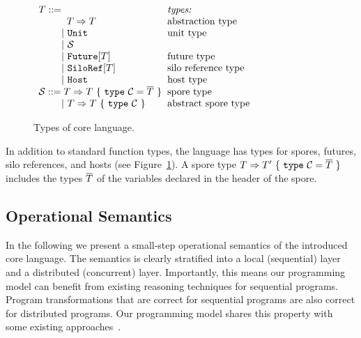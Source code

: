 \begin{figure}[h!]
\centering
$\ba[t]{l@{\hspace{2mm}}l}
T ::=                                                                  & \mbox{{\it{types:}}} \\
\gap \:\:\:\: T \Rightarrow T                                          & \mbox{abstraction type} \\
\gap ~|~  \texttt{Unit}                                                & \mbox{unit type} \\
\gap ~|~  \mathcal{S}                                                  & \mbox{} \\
\gap ~|~  \texttt{Future}[T]                                           & \mbox{future type} \\
\gap ~|~  \texttt{SiloRef}[T]                                          & \mbox{silo reference type} \\
\gap ~|~  \texttt{Host}                                                & \mbox{host type} \\
\mathcal{S} ::= T \Rightarrow T~\{~\texttt{type}~\mathcal{C} = \seq{T}~\}   & \mbox{spore type} \\
\gap ~|~ T \Rightarrow T~\{~\texttt{type}~\mathcal{C}~\}               & \mbox{abstract spore type} \\
\ea$
\caption{Types of core language.}\label{fig:types}
\end{figure}

In addition to standard function types, the language has types for
spores, futures, silo references, and hosts (see
Figure~\ref{fig:types}). A spore type $T \Rightarrow
T'~\{~\texttt{type}~\mathcal{C} = \overline{T}~\}$ includes the types
$\overline{T}$ of the variables declared in the header of the spore.

\subsection{Operational Semantics}\label{sec:opsem}

In the following we present a small-step operational semantics of the
introduced core language. The semantics is clearly stratified into a
local (sequential) layer and a distributed (concurrent)
layer. Importantly, this means our programming model can benefit from
existing reasoning techniques for sequential programs. Program
transformations that are correct for sequential programs are also
correct for distributed programs. Our programming model shares this
property with some existing approaches~\cite{ConcurrentHaskell}.

